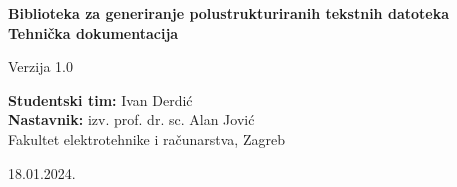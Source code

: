 \begin{titlepage} %

	\raggedleft %
	
	\vspace*{\baselineskip} %
	
	\vspace*{0.167\textheight} %
	
	
	\textbf{\LARGE Biblioteka za generiranje polustrukturiranih tekstnih datoteka}\\[\baselineskip]

	\textbf{\LARGE Tehnička dokumentacija}

	\Large Verzija 1.0
	
	\vspace*{0.167\textheight}

	\textbf{\Large Studentski tim:} \large Ivan Derdić \\[\baselineskip]

	\textbf{\Large Nastavnik:} \large izv. prof. dr. sc. Alan Jović \\[\baselineskip]
	
	\small Fakultet elektrotehnike i računarstva, Zagreb 

	\small 18.01.2024.\\[\baselineskip]

\end{titlepage}


\tableofcontents
\clearpage
{}








